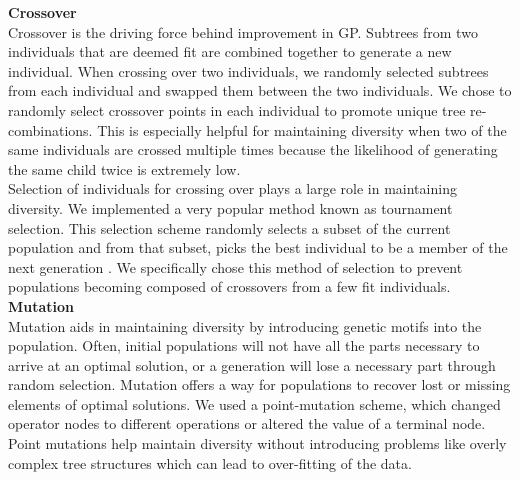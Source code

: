 \textbf{Crossover}\\
	Crossover is the driving force behind improvement in GP. Subtrees from two individuals that are deemed fit are combined together to generate a new individual. When crossing over two individuals, we randomly selected subtrees from each individual and swapped them between the two individuals.  We chose to randomly select crossover points in each individual to promote unique tree re-combinations. This is especially helpful for maintaining diversity when two of the same individuals are crossed multiple times because the likelihood of generating the same child twice is extremely low.\\
	Selection of individuals for crossing over plays a large role in maintaining diversity. We implemented a very popular method known as tournament selection. This selection scheme randomly selects a subset of the current population and from that subset, picks the best individual to be a member of the next generation \cite{Gupta_anoverview}. We specifically chose this method of selection to prevent populations becoming composed of crossovers from a few fit individuals.\\

\textbf{Mutation}\\
	Mutation aids in maintaining diversity by introducing genetic motifs into the population. Often, initial populations will not have all the parts necessary to arrive at an optimal solution, or a generation will lose a necessary part through random selection. Mutation offers a way for populations to recover lost or missing elements of optimal solutions. We used a point-mutation scheme, which changed operator nodes to different operations or altered the value of a terminal node. Point mutations help maintain diversity without introducing problems like overly complex tree structures which can lead to over-fitting of the data.\\

